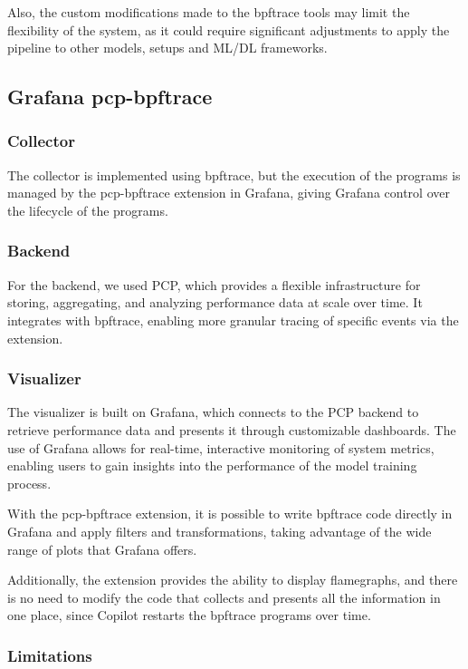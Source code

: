\documentclass[conference]{IEEEtran}
\begin{document}
Also, the custom modifications made to the bpftrace tools may limit the flexibility of the system, as it could require significant adjustments to apply the pipeline to other models, setups and ML/DL frameworks.

\subsection{Grafana pcp-bpftrace}

\subsubsection{Collector}

The collector is implemented using bpftrace, but the execution of the programs is managed by the pcp-bpftrace extension in Grafana, giving Grafana control over the lifecycle of the programs.

\subsubsection{Backend}

For the backend, we used PCP, which provides a flexible infrastructure for storing, aggregating, and analyzing performance data at scale over time.
It integrates with bpftrace, enabling more granular tracing of specific events via the extension.

\subsubsection{Visualizer}

The visualizer is built on Grafana, which connects to the PCP backend to retrieve performance data and presents it through customizable dashboards.
The use of Grafana allows for real-time, interactive monitoring of system metrics, enabling users to gain insights into the performance of the model training process.

With the pcp-bpftrace extension, it is possible to write bpftrace code directly in Grafana and apply filters and transformations, taking advantage of the wide range of plots that Grafana offers.

Additionally, the extension provides the ability to display flamegraphs, and there is no need to modify the code that collects and presents all the information in one place, since Copilot restarts the bpftrace programs over time.

\subsubsection{Limitations}
\end{document}
